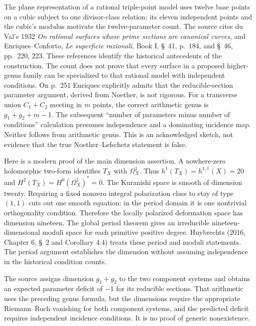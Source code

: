 The plane representation of a rational triple-point model uses twelve base points on a cubic subject to one divisor-class relation; its eleven independent points and the cubic's modulus motivate the twelve-parameter count. The source cites du Val's 1932 \emph{On rational surfaces whose prime sections are canonical curves}, and Enriques--Conforto, \emph{Le superficie razionali}, Book I, \S~41, p.~184, and \S~46, pp.~220, 223. These references identify the historical antecedents of the construction. The count does not prove that every surface in a proposed higher-genus family can be specialized to that rational model with independent conditions. On p.~251 Enriques explicitly admits that the reducible-section parameter argument, derived from Noether, is not rigorous. For a transverse union \(C_1+C_2\) meeting in \(m\) points, the correct arithmetic genus is \(g_1+g_2+m-1\). The subsequent ``number of parameters minus number of conditions'' calculation presumes independence and a dominating incidence map. Neither follows from arithmetic genus. This is an acknowledged sketch, not evidence that the true Noether--Lefschetz statement is false.

Here is a modern proof of the main dimension assertion. A nowhere-zero holomorphic two-form identifies \(T_X\) with \(\Omega_X^1\). Thus \(h^1(T_X)=h^{1,1}(X)=20\) and \(H^2(T_X)=H^0(\Omega_X^1)^*=0\). The Kuranishi space is smooth of dimension twenty. Requiring a fixed nonzero integral polarization class to stay of type \((1,1)\) cuts out one smooth equation: in the period domain it is one nontrivial orthogonality condition. Therefore the locally polarized deformation space has dimension nineteen. The global period theorem gives an irreducible nineteen-dimensional moduli space for each primitive positive degree. Huybrechts (2016, Chapter 6, \S~2 and Corollary 4.4) treats these period and moduli statements. The period argument establishes the dimension without assuming independence in the historical condition counts.

The source assigns dimension \(g_1+g_2\) to the two component systems and obtains an expected parameter deficit of \(-1\) for its reducible sections. That arithmetic uses the preceding genus formula, but the dimensions require the appropriate Riemann--Roch vanishing for both component systems, and the predicted deficit requires independent incidence conditions. It is no proof of generic nonexistence.

